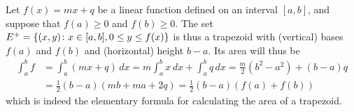 \begin{example}
Let $f(x) = mx + q$ be a linear function defined on an interval $[a,b]$, and
suppose that $f(a)\ge 0$ and $f(b)\ge 0$. The set $E^+={\left\{ (x,y)\colon x\in
[a,b], 0\le y \le f(x) \right\}}$ is thus a trapezoid with (vertical) bases $f(a)$ and
$f(b)$ and (horizontal) height $b-a$. Its area will thus be
\begin{align*}
  \int_a^b f 
  &= \int_a^b (mx+q)\, dx 
  = m\int_a^b x\, dx + \int_a^b q\, dx
  = \frac{m}{2}(b^2-a^2) + (b-a) q\\ 
  &= \frac 1 2 (b-a)(mb+ma+2q)
  = \frac 1 2 (b-a)(f(a) + f(b))
\end{align*}
which is indeed the elementary formula for calculating the area of a trapezoid.
\end{example}